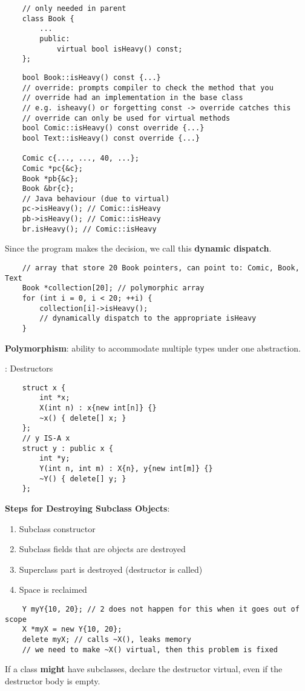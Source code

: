 \begin{lstlisting}
    // only needed in parent
    class Book {
        ...
        public:
            virtual bool isHeavy() const;
    };
\end{lstlisting}

\begin{lstlisting}
    bool Book::isHeavy() const {...}
    // override: prompts compiler to check the method that you 
    // override had an implementation in the base class
    // e.g. isheavy() or forgetting const -> override catches this
    // override can only be used for virtual methods
    bool Comic::isHeavy() const override {...}
    bool Text::isHeavy() const override {...}

    Comic c{..., ..., 40, ...};
    Comic *pc{&c};
    Book *pb{&c};
    Book &br{c};
    // Java behaviour (due to virtual)
    pc->isHeavy(); // Comic::isHeavy
    pb->isHeavy(); // Comic::isHeavy
    br.isHeavy(); // Comic::isHeavy
\end{lstlisting}
Since the program makes the decision, we call this \textbf{dynamic dispatch}.

\begin{lstlisting}
    // array that store 20 Book pointers, can point to: Comic, Book, Text
    Book *collection[20]; // polymorphic array
    for (int i = 0, i < 20; ++i) {
        collection[i]->isHeavy();
        // dynamically dispatch to the appropriate isHeavy
    }
\end{lstlisting}
\textbf{Polymorphism}: ability to accommodate multiple types
under one abstraction.

: Destructors
\begin{lstlisting}
    struct x {
        int *x;
        X(int n) : x{new int[n]} {}
        ~x() { delete[] x; }
    };
    // y IS-A x
    struct y : public x {
        int *y;
        Y(int n, int m) : X{n}, y{new int[m]} {}
        ~Y() { delete[] y; }
    };
\end{lstlisting}

\textbf{Steps for Destroying Subclass Objects}:
\begin{enumerate}[label=(\arabic*)]
    \item Subclass constructor
    \item Subclass fields that are objects are destroyed
    \item Superclass part is destroyed (destructor is called)
    \item Space is reclaimed
\end{enumerate}
\begin{lstlisting}
    Y myY{10, 20}; // 2 does not happen for this when it goes out of scope
    X *myX = new Y{10, 20};
    delete myX; // calls ~X(), leaks memory
    // we need to make ~X() virtual, then this problem is fixed
\end{lstlisting}
If a class \textbf{might} have subclasses, declare the destructor virtual,
even if the destructor body is empty.

